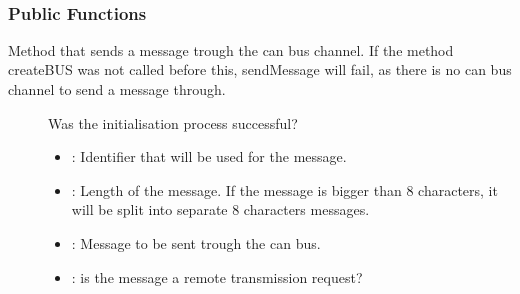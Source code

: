 \documentclass[a4paper,10pt,english]{sphinxmanual}
\begin{document}
\begin{fulllineitems}
\label{\detokenize{classestracing:_CPPv412CSockCanScan}}%
\pysigstartmultiline
{}%
\pysigstopmultiline~\subsubsection*{Public Functions}

\begin{fulllineitems}
\label{\detokenize{classestracing:_CPPv4N12CSockCanScan11sendMessageEshPhb}}%
\pysigstartmultiline
{}%
\pysigstopmultiline
Method that sends a message trough the can bus channel. If the method createBUS was not called before this, sendMessage will fail, as there is no can bus channel to send a message through.

\begin{description}
\item[{}] \leavevmode
Was the initialisation process successful? 

\item[{}] \leavevmode\begin{itemize}
\item {} 
: Identifier that will be used for the message. 

\item {} 
: Length of the message. If the message is bigger than 8 characters, it will be split into separate 8 characters messages. 

\item {} 
: Message to be sent trough the can bus. 

\item {} 
: is the message a remote transmission request? 


\end{itemize}
\end{description}
\end{fulllineitems}
\end{fulllineitems}
\end{document}

